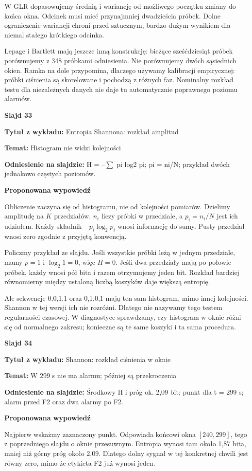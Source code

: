 \documentclass[a4paper,11pt]{article}
\newcommand{\NumerSlajdu}{1}
\newcommand{\Komentarz}[3]{%
  \gdef\NumerSlajdu{#1}%
  {\Large\bfseries Slajd #1\par}\smallskip
  \textbf{Tytuł z wykładu:} #2\par
  \textbf{Temat:} #3\par\medskip
}
\begin{document}
W GLR dopasowujemy średnią i wariancję od możliwego początku zmiany do końca okna. Odcinek musi mieć przynajmniej dwadzieścia próbek. Dolne ograniczenie wariancji chroni przed sztucznym, bardzo dużym wynikiem dla niemal stałego krótkiego odcinka.

Lepage i Bartlett mają jeszcze inną konstrukcję: bieżące sześćdziesiąt próbek porównujemy z 348 próbkami odniesienia. Nie porównujemy dwóch sąsiednich okien. Ramka na dole przypomina, dlaczego używamy kalibracji empirycznej: próbki ciśnienia są skorelowane i pochodzą z różnych faz. Nominalny rozkład testu dla niezależnych danych nie daje tu automatycznie poprawnego poziomu alarmów.
\clearpage

\Komentarz{33}{Entropia Shannona: rozkład amplitud}{Histogram nie widzi kolejności}
{\small\color{black!65}\textbf{Odniesienie na slajdzie:} H = --\ensuremath{\sum} pi log2 pi; pi = ni/N; przykład dwóch jednakowo częstych poziomów.\par}
\medskip
\textbf{Proponowana wypowiedź}\par
Obliczenie zaczyna się od histogramu, nie od kolejności pomiarów. Dzielimy amplitudę na $K$ przedziałów. $n_i$ liczy próbki w przedziale, a $p_i=n_i/N$ jest ich udziałem. Każdy składnik $-p_i\log_2p_i$ wnosi informację do sumy. Pusty przedział wnosi zero zgodnie z przyjętą konwencją.

Policzmy przykład ze slajdu. Jeśli wszystkie próbki leżą w jednym przedziale, mamy $p=1$ i $\log_2 1=0$, więc $H=0$. Jeśli dwa przedziały mają po połowie próbek, każdy wnosi pół bita i razem otrzymujemy jeden bit. Rozkład bardziej równomierny między ustaloną liczbą koszyków daje większą entropię.

Ale sekwencje 0,0,1,1 oraz 0,1,0,1 mają ten sam histogram, mimo innej kolejności. Shannon w tej wersji ich nie rozróżni. Dlatego nie nazywamy tego testem regularności czasowej. W diagnostyce sprawdzamy, czy histogram w oknie różni się od normalnego zakresu; konieczne są te same koszyki i ta sama procedura.
\clearpage

\Komentarz{34}{Shannon: rozkład ciśnienia w oknie}{W 299 s nie ma alarmu; później są przekroczenia}
{\small\color{black!65}\textbf{Odniesienie na slajdzie:} Środkowy H i próg ok. 2,09 bit; punkt dla t = 299 s; alarm przed F2 oraz dwa alarmy po F2.\par}
\medskip
\textbf{Proponowana wypowiedź}\par
Najpierw wskażmy zaznaczony punkt. Odpowiada końcowi okna $[240,299]$, tego z poprzedniego slajdu o oknie przesuwnym. Entropia wynosi tam około 1,87 bita, mniej niż górny próg około 2,09. Dlatego dolny sygnał w tej konkretnej chwili jest równy zero, mimo że etykieta F2 już wynosi jeden.
\end{document}
